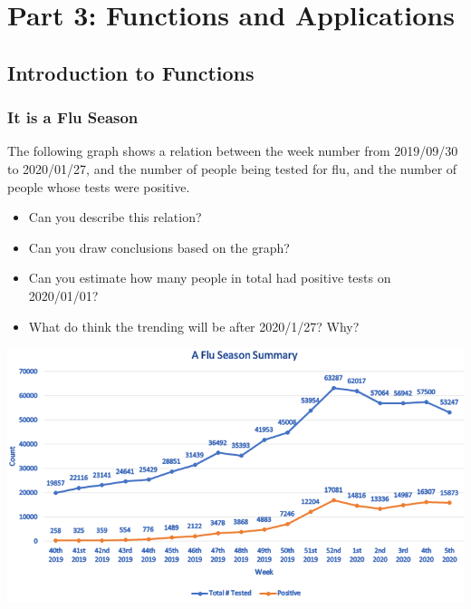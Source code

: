 \documentclass[
  en,11pt]{elegantbook}
\newcommand{\size}[2]{{\fontsize{#1}{0}\selectfont#2}}
\newenvironment{rmdthink}{
	\vspace*{0.5\baselineskip}
	\par\noindent
	\makebox[-4pt][r]{\color{green!90}\size{12}{\faLightbulbO}\,\,}
    \begin{tcolorbox}[
    enhanced,
    title={\textbf{\color{second}Think}},
    title style={left color=blue!10!green!20!white,right color=yellow!20!blue!20!white},
    colback=green!20!white,
    ]
    \sffamily
}{
    \end{tcolorbox}
	\par\ignorespacesafterend
}
\begin{document}
\hypertarget{part-part-3-functions-and-applications}{%
\part*{Part 3: Functions and Applications}\label{part-part-3-functions-and-applications}}

\hypertarget{introduction-to-functions}{%
\chapter{Introduction to Functions}\label{introduction-to-functions}}

\hypertarget{it-is-a-flu-season}{%
\section{It is a Flu Season}\label{it-is-a-flu-season}}

\begin{rmdthink}

The following graph shows a relation between the week number from 2019/09/30 to 2020/01/27, and the number of people being tested for flu, and the number of people whose tests were positive.

\begin{itemize}

\item
  Can you describe this relation?
\item
  Can you draw conclusions based on the graph?
\item
  Can you estimate how many people in total had positive tests on 2020/01/01?
\item
  What do think the trending will be after 2020/1/27? Why?
\end{itemize}

\begin{center}\includegraphics[width=0.9\linewidth]{figs/flu-season} \end{center}

\end{rmdthink}
\end{document}
